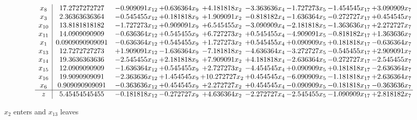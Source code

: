 \documentclass[10pt]{article}
\begin{document}
 \[\begin{array}{c| c c@{\hskip 2pt} c@{\hskip 2pt} c@{\hskip 2pt} c@{\hskip 2pt} c@{\hskip 2pt} c@{\hskip 2pt} c@{\hskip 2pt} }
 x_{8}   &  17.2727272727 & -0.909091 x_{12} & + 0.636364 x_{9} & + 4.181818 x_{2} & -3.363636 x_{4} & -1.727273 x_{5} & -1.454545 x_{17} & + 3.090909 x_{7}\\
 x_{3}   &  2.36363636364 & -0.545455 x_{12} & + 0.181818 x_{9} & + 1.909091 x_{2} & -0.818182 x_{4} & -1.636364 x_{5} & -0.272727 x_{17} & + 0.454545 x_{7}\\
 x_{10}   &  13.8181818182 & -1.727273 x_{12} & + 0.909091 x_{9} & + 6.545455 x_{2} & -3.090909 x_{4} & -2.181818 x_{5} & -1.363636 x_{17} & + 2.272727 x_{7}\\
 x_{11}   &  14.0909090909 & -0.636364 x_{12} & + 0.545455 x_{9} & + 6.727273 x_{2} & + 0.545455 x_{4} & -4.909091 x_{5} & -0.818182 x_{17} & + 1.363636 x_{7}\\
 x_{1}   &  0.0909090909091 & -0.636364 x_{12} & + 0.545455 x_{9} & + 1.727273 x_{2} & + 0.545455 x_{4} & + 0.090909 x_{5} & + 0.181818 x_{17} & -0.636364 x_{7}\\
 x_{13}   &  12.7272727273 & + 1.909091 x_{12} & -1.636364 x_{9} & -7.181818 x_{2} & -4.636364 x_{4} & -3.272727 x_{5} & -0.545455 x_{17} & + 2.909091 x_{7}\\
 x_{14}   &  19.3636363636 & -2.545455 x_{12} & + 2.181818 x_{9} & + 7.909091 x_{2} & + 4.181818 x_{4} & -2.636364 x_{5} & -0.272727 x_{17} & -2.545455 x_{7}\\
 x_{15}   &  12.0909090909 & -1.636364 x_{12} & + 0.545455 x_{9} & + 2.727273 x_{2} & -4.454545 x_{4} & + 0.090909 x_{5} & + 0.181818 x_{17} & -2.636364 x_{7}\\
 x_{16}   &  19.9090909091 & -2.363636 x_{12} & + 1.454545 x_{9} & + 10.272727 x_{2} & + 0.454545 x_{4} & -6.090909 x_{5} & -1.181818 x_{17} & + 2.636364 x_{7}\\
 x_{6}   &  0.909090909091 & -0.363636 x_{12} & + 0.454545 x_{9} & + 2.272727 x_{2} & + 0.454545 x_{4} & -0.090909 x_{5} & -0.181818 x_{17} & -0.363636 x_{7}\\
\hline
z    &  5.45454545455 & -0.181818 x_{12} & -0.272727 x_{9} & + 4.636364 x_{2} & -2.272727 x_{4} & -2.545455 x_{5} & -1.090909 x_{17} & + 2.818182 x_{7}\\
\end{array}\]


 $ x_{2} $ enters and $ x_{13} $ leaves 
\end{document}
